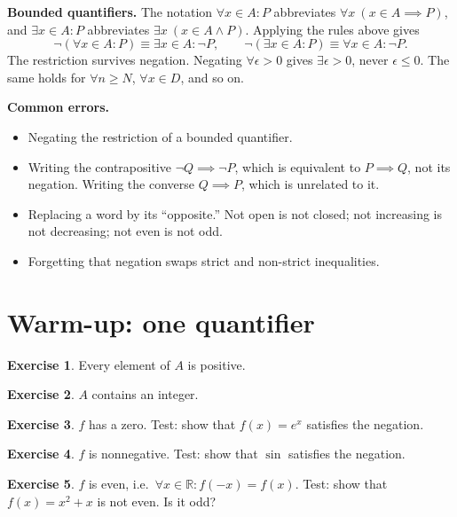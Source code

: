 \documentclass{workbook}
\theoremstyle{definition}
\newtheorem{exercise}{Exercise}[section]
\newcommand{\R}{\mathbb{R}}
\begin{document}
\textbf{Bounded quantifiers.} The notation $\forall x \in A : P$ abbreviates $\forall x\ (x \in A \implies P)$, and $\exists x \in A : P$ abbreviates $\exists x\ (x \in A \land P)$. Applying the rules above gives
\[
  \neg (\forall x \in A : P) \equiv \exists x \in A : \neg P,
  \qquad
  \neg (\exists x \in A : P) \equiv \forall x \in A : \neg P.
\]
The restriction survives negation. Negating $\forall \epsilon > 0$ gives $\exists \epsilon > 0$, never $\epsilon \le 0$. The same holds for $\forall n \ge N$, $\forall x \in D$, and so on.

\textbf{Common errors.}
\begin{itemize}
  \item Negating the restriction of a bounded quantifier.
  \item Writing the contrapositive $\neg Q \implies \neg P$, which is equivalent to $P \implies Q$, not its negation. Writing the converse $Q \implies P$, which is unrelated to it.
  \item Replacing a word by its ``opposite.'' Not open is not closed; not increasing is not decreasing; not even is not odd.
  \item Forgetting that negation swaps strict and non-strict inequalities.
\end{itemize}

\section{Warm-up: one quantifier}

\begin{exercise}\label{ex:pos}
Every element of $A$ is positive.
\end{exercise}

\begin{exercise}\label{ex:int}
$A$ contains an integer.
\end{exercise}

\begin{exercise}\label{ex:zero}
$f$ has a zero. Test: show that $f(x) = e^x$ satisfies the negation.
\end{exercise}

\begin{exercise}\label{ex:nonneg}
$f$ is nonnegative. Test: show that $\sin$ satisfies the negation.
\end{exercise}

\begin{exercise}\label{ex:even}
$f$ is even, i.e.\ $\forall x \in \R : f(-x) = f(x)$. Test: show that $f(x) = x^2 + x$ is not even. Is it odd?
\end{exercise}
\end{document}
